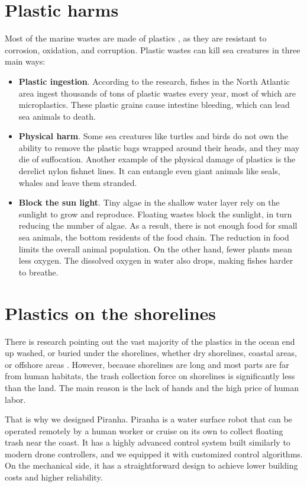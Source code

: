 \section{Plastic harms}

Most of the marine wastes are made of plastics \cite{Lebreton2018}, as they are resistant to corrosion, oxidation, and corruption. Plastic wastes can kill sea creatures in three main ways:

\begin{itemize}
    \item \textbf{Plastic ingestion}. According to the research, fishes in the North Atlantic area ingest thousands of tons of plastic wastes every year, most of which are microplastics. These plastic grains cause intestine bleeding, which can lead sea animals to death. \cite{Davisonmeps09142}
    \item \textbf{Physical harm}.  Some sea creatures like turtles and birds do not own the ability to remove the plastic bags wrapped around their heads, and they may die of suffocation. Another example of the physical damage of plastics is the derelict nylon fishnet lines. It can entangle even giant animals like seals, whales and leave them stranded.
    \item \textbf{Block the sun light}. Tiny algae in the shallow water layer rely on the sunlight to grow and reproduce. Floating wastes block the sunlight, in turn reducing the number of algae. As a result, there is not enough food for small sea animals, the bottom residents of the food chain. The reduction in food limits the overall animal population. On the other hand, fewer plants mean less oxygen. The dissolved oxygen in water also drops, making fishes harder to breathe.
\end{itemize}

\section{Plastics on the shorelines}

There is research pointing out the vast majority of the plastics in the ocean end up washed, or buried under the shorelines, whether dry shorelines, coastal areas, or offshore areas \cite{owidplasticpollution}. However, because shorelines are long and most parts are far from human habitats, the trash collection force on shorelines is significantly less than the land. The main reason is the lack of hands and the high price of human labor.

That is why we designed Piranha. Piranha is a water surface robot that can be operated remotely by a human worker or cruise on its own to collect floating trash near the coast. It has a highly advanced control system built similarly to modern drone controllers, and we equipped it with customized control algorithms. On the mechanical side, it has a straightforward design to achieve lower building costs and higher reliability. 

